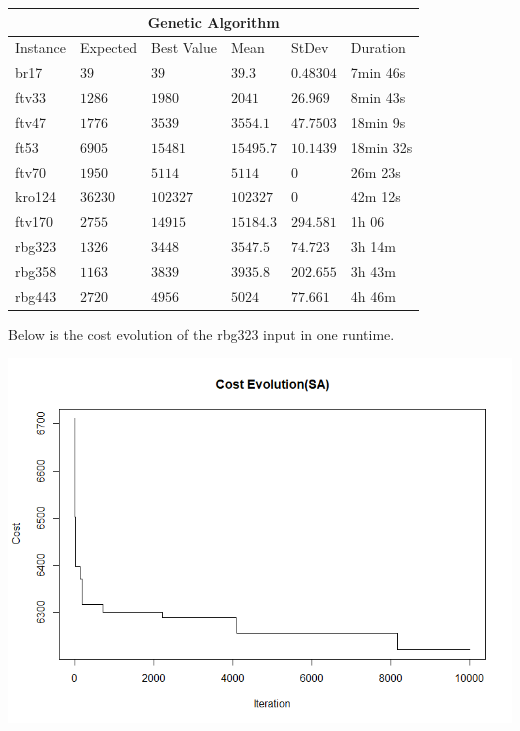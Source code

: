 \documentclass[12pt,leqno]{article}
\begin{document}
\begin{center}
  \begin{tabular}{|p{2.3cm}|p{2cm}||p{3cm}|p{2cm}|p{2cm}|p{2cm}|} 
    \hline
    \multicolumn{6}{|c|}{Genetic Algorithm} \\
    \hline
    Instance      &  Expected  & Best Value & Mean & StDev & Duration \\ 
    \hline\hline
    br17          & $39$ & $ 39 $ & $ 39.3 $ & $ 0.48304 $ & 7min 46s \\ 
    \hline
    ftv33         & $1286$ & $ 1980 $ & $ 2041 $ & $ 26.969 $ & 8min 43s \\ 
    \hline
    ftv47         & $ 1776 $ & $ 3539 $ & $ 3554.1 $ & $47.7503$ & 18min 9s \\ 
    \hline
    ft53          & $6905$ & $ 15481 $ & $ 15495.7 $ & $ 10.1439 $ & 18min 32s \\ 
    \hline
    ftv70         & $1950$ & $ 5114 $ & $ 5114 $ & $ 0 $ & 26m 23s \\ 
    \hline
    kro124        & $36230$ & $ 102327 $ & $ 102327 $ & $ 0 $ & 42m 12s \\ 
    \hline
    ftv170        & $2755$ & $ 14915 $ & $ 15184.3 $ & $ 294.581 $ & 1h 06 \\ 
    \hline
    rbg323        & $1326$ & $ 3448 $ & $ 3547.5 $ & $ 74.723 $ & 3h 14m \\ 
    \hline
    rbg358        & $1163$ & $ 3839  $ & $ 3935.8 $ & $ 202.655 $ & 3h 43m \\ 
    \hline
    rbg443        & $2720$ & $ 4956 $ & $ 5024 $ & $ 77.661 $ & 4h 46m \\ 
    \hline
 \end{tabular}
\end{center}

Below is the cost evolution of the rbg323 input in one runtime.
\pagebreak

\includegraphics[width=0.9\linewidth]{sa.png} 
\end{document}
